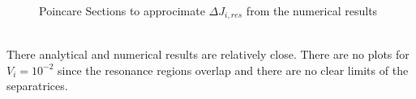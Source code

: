 \begin{figure}[hb!]
\begin{subfigure}{.49\textwidth}
  		\label{fig2.10d}
	\end{subfigure}	
	\caption{Poincare Sections to approcimate $\Delta J_{i,res}$ from the numerical results}
	\label{fig2.10}
\end{figure}\\
There analytical and numerical results are relatively close. There are no plots for $V_i=10^{-2}$ since the resonance regions overlap and there are no clear limits of the separatrices.